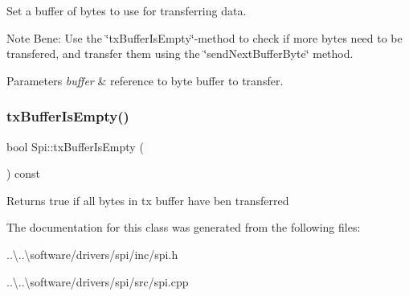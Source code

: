 Set a buffer of bytes to use for transferring data.

Note Bene\+: Use the \char`\"{}tx\+Buffer\+Is\+Empty\char`\"{}-\/method to check if more bytes need to be transfered, and transfer them using the \char`\"{}send\+Next\+Buffer\+Byte\char`\"{} method.


\begin{DoxyParams}{Parameters}
{\em buffer} & reference to byte buffer to transfer. \\
\hline
\end{DoxyParams}
\mbox{\label{class_spi_a8cf0289f4aaa9298b479a48de1dd6cb8}} 
\subsubsection{\texorpdfstring{tx\+Buffer\+Is\+Empty()}{txBufferIsEmpty()}}
{\footnotesize\ttfamily bool Spi\+::tx\+Buffer\+Is\+Empty (\begin{DoxyParamCaption}{ }\end{DoxyParamCaption}) const}

\begin{DoxyReturn}{Returns}
true if all bytes in tx buffer have ben transferred 
\end{DoxyReturn}


The documentation for this class was generated from the following files\+:\begin{DoxyCompactItemize}
\item 
..\textbackslash{}..\textbackslash{}software/drivers/spi/inc/spi.\+h\item 
..\textbackslash{}..\textbackslash{}software/drivers/spi/src/spi.\+cpp\end{DoxyCompactItemize}
